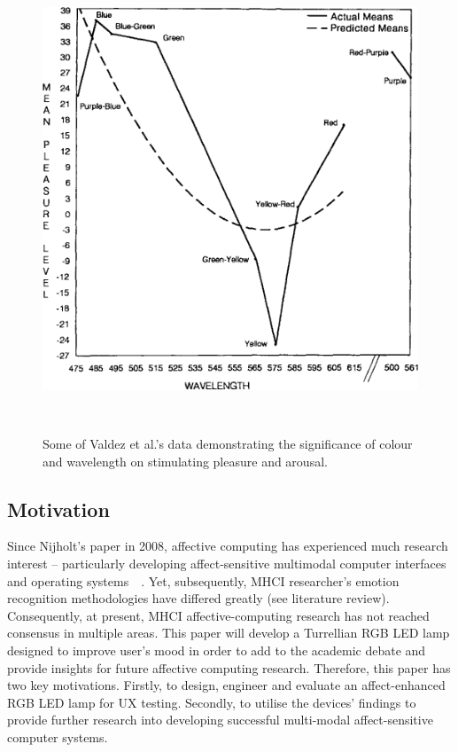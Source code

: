 \documentclass{sigchi}
\begin{document}
\begin{figure}
\centering
  \includegraphics[width=0.9\columnwidth]{figures/Valdez}
  \caption{Some of Valdez et al.'s data demonstrating the significance of colour and wavelength on stimulating pleasure and arousal.}~\cite{valdez1994effects}~\label{fig:figure1}
\end{figure}


\subsection{Motivation}

Since Nijholt’s paper in 2008, affective computing has experienced much research interest – particularly developing affect-sensitive multimodal computer interfaces and operating systems~\cite{pantic2008human}~\cite{5771346}. Yet, subsequently, MHCI researcher’s emotion recognition methodologies have differed greatly (see literature review). Consequently, at present, MHCI affective-computing research has not reached consensus in multiple areas. This paper will develop a Turrellian RGB LED lamp designed to improve user’s mood in order to add to the academic debate and provide insights for future affective computing research. Therefore, this paper has two key motivations. Firstly, to design, engineer and evaluate an affect-enhanced RGB LED lamp for UX testing. Secondly, to utilise the devices’ findings to provide further research into developing successful multi-modal affect-sensitive computer systems.
\end{document}
